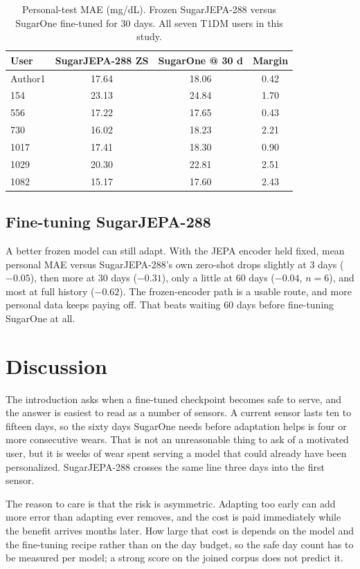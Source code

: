 \documentclass[11pt,a4paper]{article}
\begin{document}
\begin{table}[t]
\centering
\small
\begin{tabular}{lccc}
\toprule
User & SugarJEPA-288 ZS & SugarOne @ 30 d & Margin \\
\midrule
Author1 & 17.64 & 18.06 & 0.42 \\
154 & 23.13 & 24.84 & 1.70 \\
556 & 17.22 & 17.65 & 0.43 \\
730 & 16.02 & 18.23 & 2.21 \\
1017 & 17.41 & 18.30 & 0.90 \\
1029 & 20.30 & 22.81 & 2.51 \\
1082 & 15.17 & 17.60 & 2.43 \\
\bottomrule
\end{tabular}
\caption{Personal-test MAE (mg/dL). Frozen SugarJEPA-288 versus SugarOne
fine-tuned for 30 days. All seven T1DM users in this study.}
\label{tab:slice}
\end{table}

\subsection{Fine-tuning SugarJEPA-288}
\label{sec:jepaft}

A better frozen model can still adapt. With the JEPA encoder held fixed,
mean personal MAE versus SugarJEPA-288's own zero-shot drops slightly at
3 days (\(-0.05\)), then more at 30 days (\(-0.31\)), only a little at
60 days (\(-0.04\), \(n=6\)), and most at full history (\(-0.62\)). The
frozen-encoder path is a usable route, and more personal data keeps paying
off. That beats waiting 60 days before fine-tuning SugarOne at all.

\section{Discussion}
\label{sec:discussion}

The introduction asks when a fine-tuned checkpoint becomes safe to serve,
and the answer is easiest to read as a number of sensors. A current sensor
lasts ten to fifteen days, so the sixty days SugarOne needs before
adaptation helps is four or more consecutive wears. That is not an
unreasonable thing to ask of a motivated user, but it is weeks of wear spent
serving a model that could already have been personalized. SugarJEPA-288
crosses the same line three days into the first sensor.

The reason to care is that the risk is asymmetric. Adapting too early can
add more error than adapting ever removes, and the cost is paid immediately
while the benefit arrives months later. How large that cost is depends on
the model and the fine-tuning recipe rather than on the day budget, so the
safe day count has to be measured per model; a strong score on the joined
corpus does not predict it.
\end{document}
